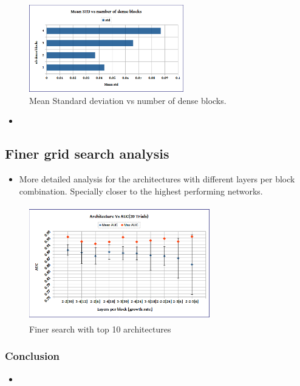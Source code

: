 \begin{figure}[h]
\centering
\includegraphics[width=0.6\textwidth]{images/densenet/std_vs_denseblocks.png}
\caption{\label{fig:std_vs_denseblocks} Mean Standard deviation vs number of dense blocks.}
\end{figure}

\begin{itemize}
 \item 
\end{itemize}

\subsection{Finer grid search analysis}
\begin{itemize}
 \item More detailed analysis for the architectures with different layers per block combination. Specially closer to the highest performing networks.
\end{itemize}

\begin{figure}[h]
\centering
\includegraphics[height=5cm,width=0.7\textwidth]{images/densenet/arch_vs_auc_finer}
\caption{Finer search with top 10 architectures}
\label{fig:arch_vs_auc_finer}
\end{figure}

\subsubsection{Conclusion}
\begin{itemize}
 \item 
\end{itemize}

